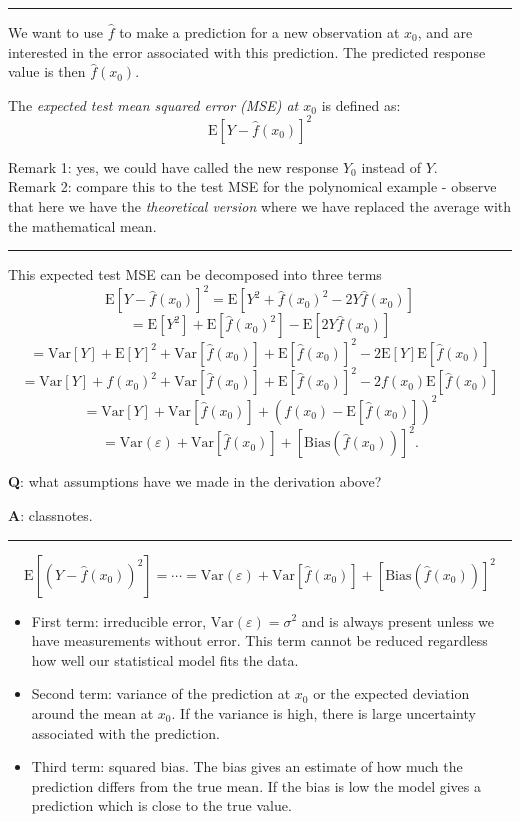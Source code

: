 \documentclass[]{article}
\providecommand{\tightlist}{%
  \setlength{\itemsep}{0pt}\setlength{\parskip}{0pt}}
\begin{document}
\begin{center}\rule{0.5\linewidth}{\linethickness}\end{center}

We want to use \(\hat{f}\) to make a prediction for a new observation at
\(x_0\), and are interested in the error associated with this
prediction. The predicted response value is then \(\hat{f}(x_0)\).

The \emph{expected test mean squared error (MSE) at \(x_0\)} is defined
as: \[\text{E}[Y - \hat{f}(x_0)]^2\]

Remark 1: yes, we could have called the new response \(Y_0\) instead of
\(Y\).\\
Remark 2: compare this to the test MSE for the polynomical example -
observe that here we have the \emph{theoretical version} where we have
replaced the average with the mathematical mean.

\begin{center}\rule{0.5\linewidth}{\linethickness}\end{center}

This expected test MSE can be decomposed into three terms
\[\text{E}[Y - \hat{f}(x_0)]^2 = \text{E}[Y^2 + \hat{f}(x_0)^2 - 2 Y \hat{f}(x_0)] \]
\[= \text{E}[Y^2] + \text{E}[\hat{f}(x_0)^2] - \text{E}[2Y \hat{f}(x_0)]\]
\[= \text{Var}[Y] + \text{E}[Y]^2 + \text{Var}[\hat{f}(x_0)] + \text{E}[\hat{f}(x_0)]^2 - 2 \text{E}[Y]\text{E}[\hat{f}(x_0)] \]
\[= \text{Var}[Y]+f(x_0)^2+\text{Var}[\hat{f}(x_0)]+\text{E}[\hat{f}(x_0)]^2-2f(x_0)\text{E}[\hat{f}(x_0)]\]
\[= \text{Var}[Y]+\text{Var}[\hat{f}(x_0)]+(f(x_0)-\text{E}[\hat{f}(x_0)])^2\]
\[= \text{Var}(\varepsilon) +  \text{Var}[\hat{f}(x_0)]+[\text{Bias}(\hat{f}(x_0))]^2.\]

\textbf{Q}: what assumptions have we made in the derivation above?

\textbf{A}: classnotes.

\begin{center}\rule{0.5\linewidth}{\linethickness}\end{center}

\[\text{E}[(Y - \hat{f}(x_0))^2]=\cdots=\text{Var}(\varepsilon) +  \text{Var}[\hat{f}(x_0)]+[\text{Bias}(\hat{f}(x_0))]^2\]

\begin{itemize}
\tightlist
\item
  First term: irreducible error, \(\text{Var}(\varepsilon)=\sigma^2\)
  and is always present unless we have measurements without error. This
  term cannot be reduced regardless how well our statistical model fits
  the data.
\item
  Second term: variance of the prediction at \(x_0\) or the expected
  deviation around the mean at \(x_0\). If the variance is high, there
  is large uncertainty associated with the prediction.
\item
  Third term: squared bias. The bias gives an estimate of how much the
  prediction differs from the true mean. If the bias is low the model
  gives a prediction which is close to the true value.
\end{itemize}
\end{document}
